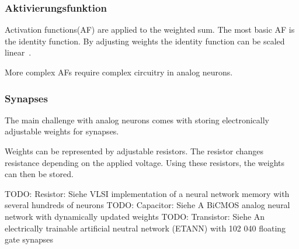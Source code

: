 \documentclass[conference]{IEEEtran}
\begin{document}
    \subsubsection{Aktivierungsfunktion}

    Activation functions(AF) are applied to the weighted sum.
    The most basic AF is the identity function.
    By adjusting weights the identity function can be scaled linear~\cite{zurada1992analog}.

    More complex AFs require complex circuitry in analog neurons.

    \subsubsection{Synapses}
    The main challenge with analog neurons comes with storing electronically adjustable weights for synapses.

    Weights can be represented by adjustable resistors.
    The resistor changes resistance depending on the applied voltage.
    Using these resistors, the weights can then be stored.

    TODO: Resistor: Siehe VLSI implementation of a neural network memory with several hundreds of neurons
    TODO: Capacitor: Siehe A BiCMOS analog neural network with dynamically updated weights
    TODO: Transistor: Siehe An electrically trainable artificial neutral network (ETANN) with 102 040 floating gate synapses




\end{document}
